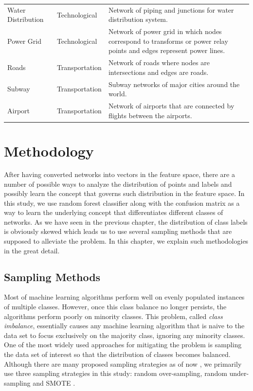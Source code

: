 \documentclass{article}
\begin{document}
\begin{longtable}{| l | l | p{9cm} |}
      Water Distribution &  Technological & Network of piping and junctions for water distribution system.\\ %
      Power Grid &  Technological & Network of power grid in which nodes correspond to transforms or power relay points and edges represent power lines.\\ %
      Roads &  Transportation & Network of roads where nodes are intersections and edges are roads.\\ %
      Subway &  Transportation & Subway networks of major cities around the world.\\ %
      Airport &  Transportation & Network of airports that are connected by flights between the airports.\\  \hline
           
\end{longtable}


\newpage
\section{Methodology}
After having converted networks into vectors in the feature space, there are a number of possible ways to analyze the distribution of points and labels and possibly learn the concept that governs such distribution in the feature space. In this study, we use random forest classifier along with the confusion matrix as a way to learn the underlying concept that differentiates different classes of networks. As we have seen in the previous chapter, the distribution of class labels is obviously skewed which leads us to use several sampling methods that are supposed to alleviate the problem. In this chapter, we explain such methodologies in the great detail.

	\subsection{Sampling Methods}
Most of machine learning algorithms perform well on evenly populated instances of multiple classes. However, once this class balance no longer persists, the algorithms perform poorly on minority classes. This problem, called \textit{class imbalance}, essentially causes any machine learning algorithm that is naive to the data set to focus exclusively on the majority class, ignoring any minority classes. One of the most widely used approaches for mitigating the problem is sampling the data set of interest so that the distribution of classes becomes balanced. Although there are many proposed sampling strategies as of now \cite{SurveySampling}, we primarily use three sampling strategies in this study: random over-sampling, random under-sampling and SMOTE \cite{SMOTE}.
\end{document}
